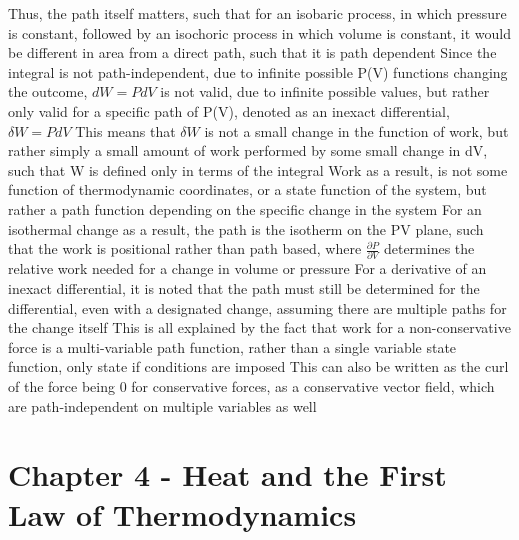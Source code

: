 \documentclass[11 pt, twoside]{article}
\newenvironment{outline*}
{
	\begin{outline}[enumerate]
	}
	{\end{outline}
}
\begin{document}
\begin{outline*}
\3 Thus, the path itself matters, such that for an isobaric process, in which pressure is constant, followed by an isochoric process in which volume is constant, it would be different in area from a direct path, such that it is path dependent
\3 Since the integral is not path-independent, due to infinite possible P(V) functions changing the outcome, $dW = PdV$ is not valid, due to infinite possible values, but rather only valid for a  specific path of P(V), denoted as an inexact differential, $\delta W = PdV$
\4 This means that $\delta W$ is not a small change in the function of work, but rather simply a small amount of work performed by some small change in dV, such that W is defined only in terms of the integral
\4 Work as a result, is not some function of thermodynamic coordinates, or a state function of the system, but rather a path function depending on the specific change in the system
\4 For an isothermal change as a result, the path is the isotherm on the PV plane, such that the work is positional rather than path based, where $\frac {\partial P}{\partial V}$ determines the relative work needed for a change in volume or pressure
\4 For a derivative of an inexact differential, it is noted that the path must still be determined for the differential, even with a designated change, assuming there are multiple paths for the change itself
\2 This is all explained by the fact that work for a non-conservative force is a multi-variable path function, rather than a single variable state function, only state if conditions are imposed
\3 This can also be written as the curl of the force being 0 for conservative forces, as a conservative vector field, which are path-independent on multiple variables as well
\end{outline*}
\section{Chapter 4 - Heat and the First Law of Thermodynamics}
\end{document}
